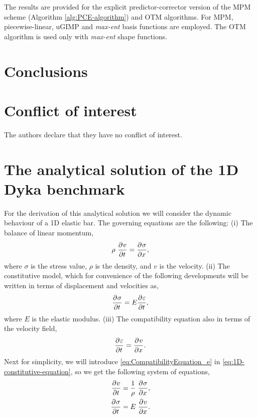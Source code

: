 The results are provided for the explicit predictor-corrector version
of the MPM scheme (Algorithm \ref{alg:PCE-algorithm}) and OTM
algorithms. For MPM, piecewise-linear, uGIMP and \textit{max-ent}
basis functions are employed. The OTM algorithm is used only with
\textit{max-ent} shape functions.

\section{Conclusions}
\label{sec:conclusions}


%
\section*{Conflict of interest}
%
The authors declare that they have no conflict of interest.


\appendix
\section{The analytical solution of the 1D Dyka benchmark}
\label{app:analytical_sol}

For the derivation of this analytical solution we will consider  the
dynamic behaviour of a 1D elastic bar. The governing equations are the
following: (i) The balance of linear momentum,
\begin{equation}
  \label{eq:1D-balance-linear-momentum}
  \rho\ \frac{\partial^{}{v}}{ \partial {t}^{} } = \frac{\partial^{}{\sigma}}{ \partial {x}^{} },
\end{equation}
where $\sigma$ is the stress value, $\rho$ is the density, and 
$v$ is the velocity. (ii) The constitutive model, which for convenience of the
following developments will be written in terms of displacement and
velocities as, 
\begin{equation}
  \label{eq:1D-constitutive-equation}
  \frac{\partial^{}{\sigma}}{ \partial {t}^{} } = E \frac{\partial^{}{\varepsilon}}{ \partial {t}^{} },
\end{equation}
where $E$ is the elastic modulus. (iii) The compatibility equation
also in terms of the velocity field,
\begin{equation}
  \label{eq:CompatibilityEquation_e}
  \frac{\partial^{}{\varepsilon}}{ \partial {t}^{} } = \frac{\partial^{}{v}}{ \partial {x}^{} }.
\end{equation}
Next for simplicity, we will introduce \eqref{eq:CompatibilityEquation_e} in 
\eqref{eq:1D-constitutive-equation}, so we get the following system of equations,
\begin{align}
  \label{eq:1D-balance-linear-momentum-II}
  \frac{\partial^{}{v}}{ \partial {t}^{} } &= \frac{1}{\rho}\ \frac{\partial^{}{\sigma}}{ \partial {x}^{} }, \\
  \label{eq:1D-constitutive-equation-II}
  \frac{\partial^{}{\sigma}}{ \partial {t}^{} } &= E\ \frac{\partial^{}{v}}{ \partial {x}^{} }.
\end{align}

